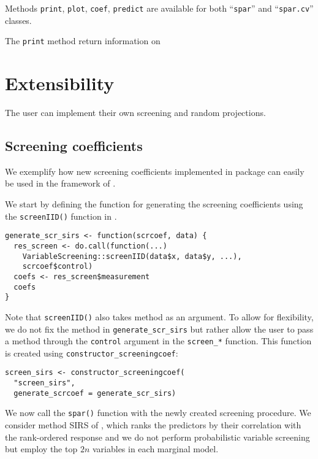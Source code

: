 \documentclass[
  article]{jss}
\begin{document}
Methods \texttt{print}, \texttt{plot}, \texttt{coef}, \texttt{predict}
are available for both ``\texttt{spar}'' and ``\texttt{spar.cv}''
classes.

The \texttt{print} method return information on

\section{Extensibility}\label{extensibility}

The user can implement their own screening and random projections.

\subsection{Screening coefficients}\label{screening-coefficients-1}

We exemplify how new screening coefficients implemented in package
 can easily be used in the framework of
.

We start by defining the function for generating the screening
coefficients using the \texttt{screenIID()} function in
.

\begin{verbatim}
generate_scr_sirs <- function(scrcoef, data) {
  res_screen <- do.call(function(...) 
    VariableScreening::screenIID(data$x, data$y, ...), 
    scrcoef$control)
  coefs <- res_screen$measurement
  coefs
}
\end{verbatim}

Note that \texttt{screenIID()} also takes method as an argument. To
allow for flexibility, we do not fix the method in
\texttt{generate\_scr\_sirs} but rather allow the user to pass a method
through the \texttt{control} argument in the \texttt{screen\_*}
function. This function is created using
\texttt{constructor\_screeningcoef}:

\begin{verbatim}
screen_sirs <- constructor_screeningcoef(
  "screen_sirs", 
  generate_scrcoef = generate_scr_sirs)
\end{verbatim}

We now call the \texttt{spar()} function with the newly created
screening procedure. We consider method SIRS of \citet{zhu2011model},
which ranks the predictors by their correlation with the rank-ordered
response and we do not perform probabilistic variable screening but
employ the top \(2n\) variables in each marginal model.
\end{document}
